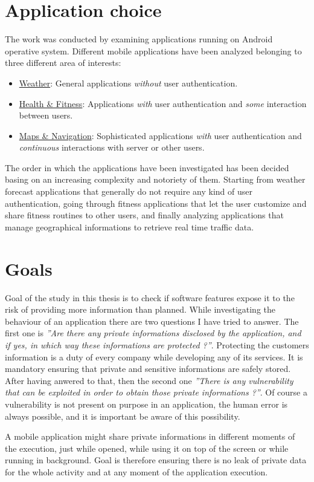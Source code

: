 	\section{Application choice}
		\par The work was conducted by examining applications running on Android operative system. Different mobile applications have been analyzed belonging to three different area of interests:
			\begin{itemize}
				\item \underline{Weather}: General applications \textit{without} user authentication.
				\item \underline{Health \& Fitness}: Applications \textit{with} user authentication and \textit{some} interaction between users.
				\item \underline{Maps \& Navigation}: Sophisticated applications  \textit{with} user authentication and \textit{continuous} interactions with server or other users.
			\end{itemize}
			\par The order in which the applications have been investigated has been decided basing on an increasing complexity and notoriety of them. Starting from weather forecast applications that generally do not require any kind of user authentication, going through fitness applications that let the user customize and share fitness routines to other users, and finally analyzing applications that manage geographical informations to retrieve real time traffic data.
	
	\section{Goals}
		\par Goal of the study in this thesis is to check if software features expose it to the risk of providing more information than planned. While investigating the behaviour of an application there are two questions I have tried to answer. \newline
		The first one is \textit{''Are there any private informations disclosed by the application, and if yes, in which way these informations are protected ?''}. Protecting the customers information is a duty of every company while developing any of its services. It is mandatory ensuring that private and sensitive informations are safely stored. \newline
		After having anwered to that, then the second one \textit{''There is any vulnerability that can be exploited in order to obtain those private informations ?''}. Of course a vulnerability is not present on purpose in an application, the human error is always possible, and it is important be aware of this possibility. \newline
		\par A mobile application might share private informations in different moments of the execution, just while opened, while using it on top of the screen or while running in background. Goal is therefore ensuring there is no leak of private data for the whole activity and at any moment of the application execution. \newline
		 
